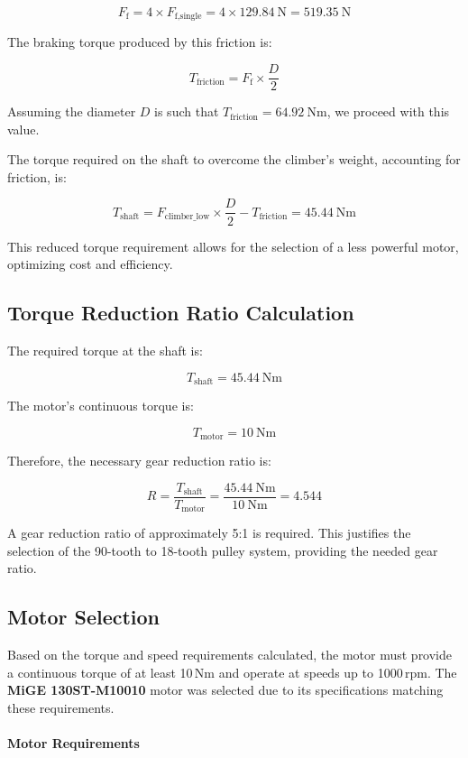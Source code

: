 \[
F_{\text{f}} = 4 \times F_{\text{f,single}} = 4 \times 129.84\ \text{N} = 519.35\ \text{N}
\]

The braking torque produced by this friction is:

\[
T_{\text{friction}} = F_{\text{f}} \times \frac{D}{2}
\]

Assuming the diameter \( D \) is such that \( T_{\text{friction}} = 64.92\ \text{Nm} \), we proceed with this value.

The torque required on the shaft to overcome the climber's weight, accounting for friction, is:

\[
T_{\text{shaft}} = F_{\text{climber\_low}} \times \frac{D}{2} - T_{\text{friction}} = 45.44\ \text{Nm}
\]

This reduced torque requirement allows for the selection of a less powerful motor, optimizing cost and efficiency.

\subsection*{Torque Reduction Ratio Calculation}

The required torque at the shaft is:

\[
T_{\text{shaft}} = 45.44\ \text{Nm}
\]

The motor's continuous torque is:

\[
T_{\text{motor}} = 10\ \text{Nm}
\]

Therefore, the necessary gear reduction ratio is:

\[
R = \frac{T_{\text{shaft}}}{T_{\text{motor}}} = \frac{45.44\ \text{Nm}}{10\ \text{Nm}} = 4.544
\]

A gear reduction ratio of approximately 5:1 is required. This justifies the selection of the 90-tooth to 18-tooth pulley system, providing the needed gear ratio.

\subsection*{Motor Selection}

Based on the torque and speed requirements calculated, the motor must provide a continuous torque of at least 10\,Nm and operate at speeds up to 1000\,rpm. The \textbf{MiGE 130ST-M10010} motor was selected due to its specifications matching these requirements.

\paragraph{Motor Requirements}


